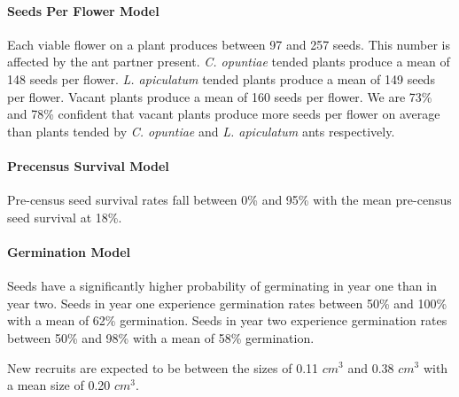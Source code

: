 \documentclass[11pt]{article}
\begin{document}
\paragraph{Seeds Per Flower Model}
Each viable flower on a plant produces between 97 and 257 seeds.
This number is affected by the ant partner present. 
\textit{C. opuntiae} tended plants produce a mean of 148 seeds per flower. 
\textit{L. apiculatum} tended plants produce a mean of 149 seeds per flower. 
Vacant plants produce a mean of 160 seeds per flower. 
We are 73\% and 78\% confident that vacant plants produce more seeds per flower on average than plants tended by \textit{C. opuntiae} and \textit{L. apiculatum} ants respectively.


\paragraph{Precensus Survival Model}
Pre-census seed survival rates fall between 0\% and 95\% with the mean pre-census seed survival at 18\%.

\paragraph{Germination Model}
Seeds have a significantly higher probability of germinating in year one than in year two.
Seeds in year one experience germination rates between 50\% and 100\% with a mean of 62\% germination.
Seeds in year two experience germination rates between 50\% and 98\% with a mean of 58\% germination.


New recruits are expected to be between the sizes of 0.11 $cm^3$ and 0.38 $cm^3$ with a mean size of 0.20 $cm^3$.

\end{document}
